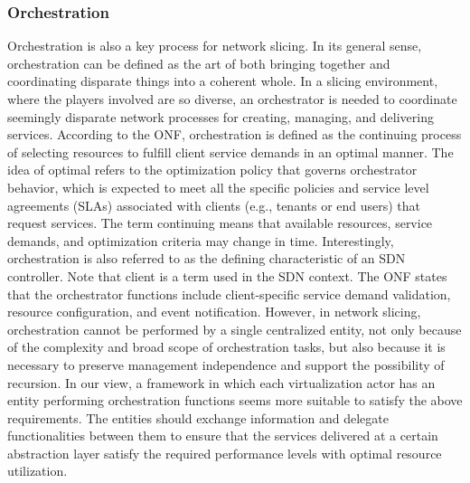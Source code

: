\documentclass{article}
\begin{document}
\subsubsection{Orchestration}
Orchestration is also a key process for network
slicing. In its general sense, orchestration can be
defined as the art of both bringing together and coordinating disparate things into a coherent whole.
In a slicing environment, where the players involved
are so diverse, an orchestrator is needed to coordinate seemingly disparate network processes for
creating, managing, and delivering services.
According to the ONF,
orchestration is defined as the continuing process of
selecting resources to fulfill client service demands
in an optimal manner. The idea of optimal refers
to the optimization policy that governs orchestrator behavior, which is expected to meet all the specific policies and service level agreements (SLAs)
associated with clients (e.g., tenants or end users)
that request services. The term continuing means
that available resources, service demands, and optimization criteria may change in time. Interestingly,
orchestration is also referred to as the defining
characteristic of an SDN controller. Note that client
is a term used in the SDN context.
The ONF states that the orchestrator functions
include client-specific service demand validation,
resource configuration, and event notification.
However, in network slicing, orchestration cannot be performed by a single centralized entity,
not only because of the complexity and broad
scope of orchestration tasks, but also because it
is necessary to preserve management independence and support the possibility of recursion. In
our view, a framework in which each virtualization
actor has an entity performing orchestration functions seems more suitable to satisfy the
above requirements. The entities should exchange
information and delegate functionalities between
them to ensure that the services delivered at a
certain abstraction layer satisfy the required performance levels with optimal resource utilization.
\end{document}
